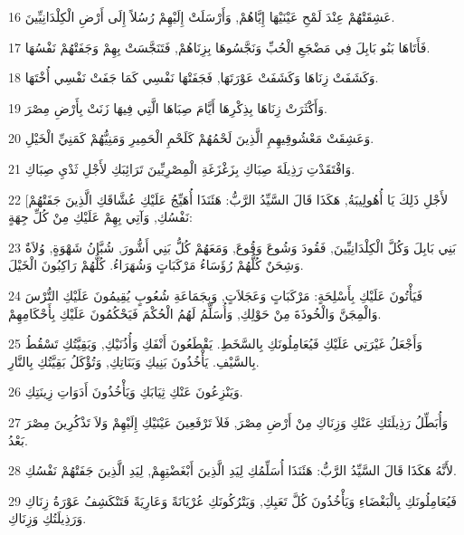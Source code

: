 \par 16 عَشِقَتْهُمْ عِنْدَ لَمْحِ عَيْنَيْهَا إِيَّاهُمْ, وَأَرْسَلَتْ إِلَيْهِمْ رُسُلاً إِلَى أَرْضِ الْكِلْدَانِيِّينَ.
\par 17 فَأَتَاهَا بَنُو بَابِلَ فِي مَضْجَعِ الْحُبِّ وَنَجَّسُوهَا بِزِنَاهُمْ, فَتَنَجَّسَتْ بِهِمْ وَجَفَتْهُمْ نَفْسُهَا.
\par 18 وَكَشَفَتْ زِنَاهَا وَكَشَفَتْ عَوْرَتَهَا, فَجَفَتْهَا نَفْسِي كَمَا جَفَتْ نَفْسِي أُخْتَهَا.
\par 19 وَأَكْثَرَتْ زِنَاهَا بِذِكْرِهَا أَيَّامَ صِبَاهَا الَّتِي فِيهَا زَنَتْ بِأَرْضِ مِصْرَ.
\par 20 وَعَشِقَتْ مَعْشُوقِيهِمِ الَّذِينَ لَحْمُهُمْ كَلَحْمِ الْحَمِيرِ وَمَنِيُّهُمْ كَمَنِيِّ الْخَيْلِ.
\par 21 وَافْتَقَدْتِ رَذِيلَةَ صِبَاكِ بِزَغْزَغَةِ الْمِصْرِيِّينَ تَرَائِبَكِ لأَجْلِ ثَدْيِ صِبَاكِ.
\par 22 [لأَجْلِ ذَلِكَ يَا أُهُولِيبَةُ, هَكَذَا قَالَ السَّيِّدُ الرَّبُّ: هَئَنَذَا أُهَيِّجُ عَلَيْكِ عُشَّاقَكِ الَّذِينَ جَفَتْهُمْ نَفْسُكِ, وَآتِي بِهِمْ عَلَيْكِ مِنْ كُلِّ جِهَةٍ:
\par 23 بَنِي بَابِلَ وَكُلَّ الْكِلْدَانِيِّينَ, فَقُودَ وَشُوعَ وَقُوعَ, وَمَعَهُمْ كُلُّ بَنِي أَشُّورَ, شُبَّانُ شَهْوَةٍ, وُلاَةٌ وَشِحَنٌ كُلُّهُمْ رُؤَسَاءُ مَرْكَبَاتٍ وَشُهَرَاءُ. كُلُّهُمْ رَاكِبُونَ الْخَيْلَ.
\par 24 فَيَأْتُونَ عَلَيْكِ بِأَسْلِحَةٍ: مَرْكَبَاتٍ وَعَجَلاَتٍ, وَبِجَمَاعَةِ شُعُوبٍ يُقِيمُونَ عَلَيْكِ التُّرْسَ وَالْمِجَنَّ وَالْخُوذَةَ مِنْ حَوْلِكِ, وَأُسَلِّمُ لَهُمُ الْحُكْمَ فَيَحْكُمُونَ عَلَيْكِ بِأَحْكَامِهِمْ.
\par 25 وَأَجْعَلُ غَيْرَتِي عَلَيْكِ فَيُعَامِلُونَكِ بِالسَّخَطِ. يَقْطَعُونَ أَنْفَكِ وَأُذُنَيْكِ, وَبَقِيَّتُكِ تَسْقُطُ بِالسَّيْفِ. يَأْخُذُونَ بَنِيكِ وَبَنَاتِكِ, وَتُؤْكَلُ بَقِيَّتُكِ بِالنَّارِ.
\par 26 وَيَنْزِعُونَ عَنْكِ ثِيَابَكِ وَيَأْخُذُونَ أَدَوَاتِ زِينَتِكِ.
\par 27 وَأُبَطِّلُ رَذِيلَتَكِ عَنْكِ وَزِنَاكِ مِنْ أَرْضِ مِصْرَ, فَلاَ تَرْفَعِينَ عَيْنَيْكِ إِلَيْهِمْ وَلاَ تَذْكُرِينَ مِصْرَ بَعْدُ.
\par 28 لأَنَّهُ هَكَذَا قَالَ السَّيِّدُ الرَّبُّ: هَئَنَذَا أُسَلِّمُكِ لِيَدِ الَّذِينَ أَبْغَضْتِهِمْ, لِيَدِ الَّذِينَ جَفَتْهُمْ نَفْسُكِ.
\par 29 فَيُعَامِلُونَكِ بِالْبَغْضَاءِ وَيَأْخُذُونَ كُلَّ تَعَبِكِ, وَيَتْرُكُونَكِ عُرْيَانَةً وَعَارِيَةً فَتَنْكَشِفُ عَوْرَةُ زِنَاكِ وَرَذِيلَتُكِ وَزِنَاكِ.
